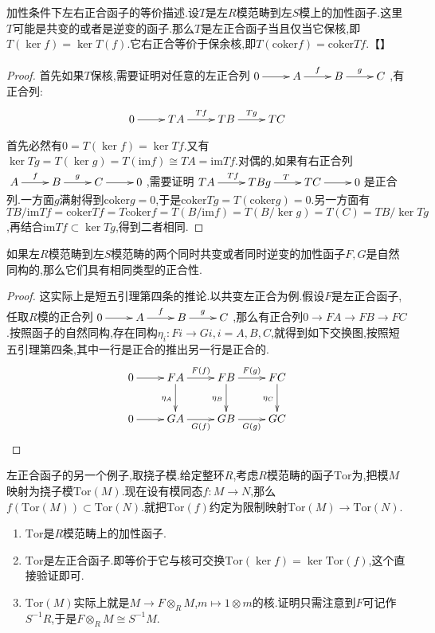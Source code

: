 加性条件下左右正合函子的等价描述.设$T$是左$R$模范畴到左$S$模上的加性函子.这里$T$可能是共变的或者是逆变的函子.那么$T$是左正合函子当且仅当它保核,即$T(\ker f)=\ker T(f)$.它右正合等价于保余核,即$T(\mathrm{coker}f)=\mathrm{coker}Tf$.【】
\begin{proof}
	
	首先如果$T$保核,需要证明对任意的左正合列$\xymatrix{0\ar[r]&A\ar[r]^{f}&B\ar[r]^g&C}$,有正合列:
	$$\xymatrix{0\ar[r]&TA\ar[r]^{Tf}&TB\ar[r]^{Tg}&TC}$$
	
	首先必然有$0=T(\ker f)=\ker Tf$.又有$\ker Tg=T(\ker g)=T(\mathrm{im}f)\cong TA=\mathrm{im}Tf$.对偶的,如果有右正合列$\xymatrix{A\ar[r]^{f}&B\ar[r]^g&C\ar[r]&0}$,需要证明$\xymatrix{TA\ar[r]^{Tf}&TB\ar[r]^Tg&TC\ar[r]&0}$是正合列.一方面$g$满射得到$\mathrm{coker}g=0$,于是$\mathrm{coker}Tg=T(\mathrm{coker}g)=0$.另一方面有$TB/\mathrm{im}Tf=\mathrm{coker}Tf=T\mathrm{coker}f=T(B/\mathrm{im}f)
	=T(B/\ker g)=T(C)=TB/\ker Tg$,再结合$\mathrm{im}Tf\subset\ker Tg$,得到二者相同.
\end{proof}

如果左$R$模范畴到左$S$模范畴的两个同时共变或者同时逆变的加性函子$F,G$是自然同构的,那么它们具有相同类型的正合性.
\begin{proof}
	
	这实际上是短五引理第四条的推论.以共变左正合为例.假设$F$是左正合函子,任取$R$模的正合列$\xymatrix{0\ar[r]&A\ar[r]^f&B\ar[r]^g&C}$,那么有正合列$0\to FA\to FB\to FC$.按照函子的自然同构,存在同构$\eta_i:Fi\to Gi,i=A,B,C$,就得到如下交换图,按照短五引理第四条,其中一行是正合的推出另一行是正合的.
	$$\xymatrix{
		0\ar[r]&FA\ar[d]_{\eta_A}\ar[r]^{F(f)}&FB\ar[d]_{\eta_B}\ar[r]^{F(g)}&FC\ar[d]_{\eta_C}\\
		0\ar[r]&GA\ar[r]_{G(f)}&GB\ar[r]_{G(g)}&GC}$$
\end{proof}

左正合函子的另一个例子,取挠子模.给定整环$R$,考虑$R$模范畴的函子$\mathrm{Tor}$为,把模$M$映射为挠子模$\mathrm{Tor}(M)$.现在设有模同态$f:M\to N$,那么$f(\mathrm{Tor}(M))\subset\mathrm{Tor}(N)$.就把$\mathrm{Tor}(f)$约定为限制映射$\mathrm{Tor}(M)\to\mathrm{Tor}(N)$.
\begin{enumerate}
	\item $\mathrm{Tor}$是$R$模范畴上的加性函子.
	\item $\mathrm{Tor}$是左正合函子.即等价于它与核可交换$\mathrm{Tor}(\ker f)=\ker\mathrm{Tor}(f)$,这个直接验证即可.
	\item $\mathrm{Tor}(M)$实际上就是$M\to F\otimes_RM$,$m\mapsto 1\otimes m$的核.证明只需注意到$F$可记作$S^{-1}R$,于是$F\otimes_RM\cong S^{-1}M$.
\end{enumerate}

